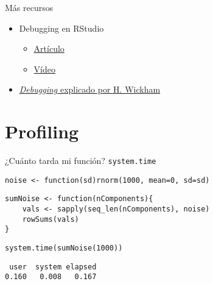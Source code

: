 \documentclass[xcolor={usenames,svgnames,dvipsnames}]{beamer}
\begin{document}
\begin{frame}[label={sec:orgheadline25}]{Más recursos}
\begin{itemize}
\item Debugging en RStudio
\begin{itemize}
\item \href{https://support.rstudio.com/hc/en-us/articles/205612627-Debugging-with-RStudio}{Artículo}
\item \href{https://vimeo.com/97831988}{Vídeo}
\end{itemize}
\item \href{http://adv-r.had.co.nz/Exceptions-Debugging.html}{\emph{Debugging} explicado por H. Wickham}
\end{itemize}
\end{frame}

\section{Profiling}
\label{sec:orgheadline30}
\begin{frame}[fragile,label={sec:orgheadline27}]{¿Cuánto tarda mi función? \texttt{system.time}}
 \lstset{language=R,label= ,caption= ,captionpos=b,numbers=none}
\begin{lstlisting}
noise <- function(sd)rnorm(1000, mean=0, sd=sd)
\end{lstlisting}

\lstset{language=R,label= ,caption= ,captionpos=b,numbers=none}
\begin{lstlisting}
sumNoise <- function(nComponents){
    vals <- sapply(seq_len(nComponents), noise)
    rowSums(vals)
}
\end{lstlisting}

\lstset{language=R,label= ,caption= ,captionpos=b,numbers=none}
\begin{lstlisting}
system.time(sumNoise(1000))
\end{lstlisting}

\begin{verbatim}
 user  system elapsed 
0.160   0.008   0.167
\end{verbatim}
\end{frame}
\end{document}

